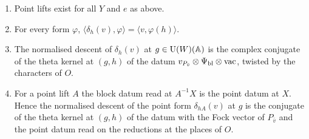 \begin{lemma}\label{lem:point-lifts}
\begin{enumerate}[label=\textup{(\alph*)}]
\item Point lifts exist for all $Y$ and $e$ as above.
\item For every form $\varphi$, $\langle\delta_h(v),\varphi\rangle=\langle v,\varphi(h)\rangle$.
\item The normalised descent of $\delta_h(v)$ at $g\in\operatorname{U}(W)(\mathbb{A})$ is the complex conjugate of the theta kernel at $(g,h)$ of the datum $v_{P_{\bar v}}\otimes\Psi_{\rm bl}\otimes\mathrm{vac}$, twisted by the characters of $O$.
\item For a point lift $A$ the block datum read at $A^{-1}X$ is the point datum at $X$. Hence the normalised descent of the point form $\delta_{hA}(v)$ at $g$ is the conjugate of the theta kernel at $(g,h)$ of
the datum with the Fock vector of $P_{\bar v}$ and the point datum read on the reductions at the places of $O$.
\end{enumerate}
\end{lemma}

